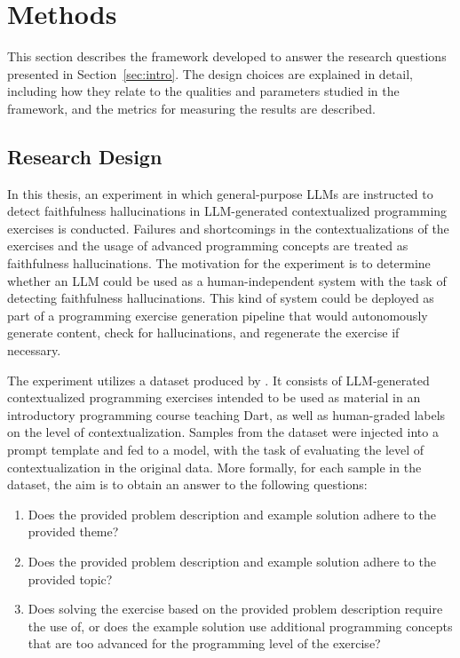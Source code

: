 \documentclass[english, 12pt, a4paper, sci, utf8, a-2b, online]{latex/definitions/aaltothesis}
\begin{document}
\clearpage

\section{Methods} \label{sec:methods}

This section describes the framework developed to answer the research questions presented in Section~\ref{sec:intro}. The design choices are explained in detail, including how they relate to the qualities and parameters studied in the framework, and the metrics for measuring the results are described.

\subsection{Research Design} \label{sec:design}

In this thesis, an experiment in which general-purpose LLMs are instructed to detect faithfulness hallucinations in LLM-generated contextualized programming exercises is conducted. Failures and shortcomings in the contextualizations of the exercises and the usage of advanced programming concepts are treated as faithfulness hallucinations. The motivation for the experiment is to determine whether an LLM could be used as a human-independent system with the task of detecting faithfulness hallucinations. This kind of system could be deployed as part of a programming exercise generation pipeline that would autonomously generate content, check for hallucinations, and regenerate the exercise if necessary. 

The experiment utilizes a dataset produced by \textcite{10.1145/3632620.3671103}. It consists of LLM-generated contextualized programming exercises intended to be used as material in an introductory programming course teaching Dart, as well as human-graded labels on the level of contextualization. Samples from the dataset were injected into a prompt template and fed to a model, with the task of evaluating the level of contextualization in the original data. More formally, for each sample in the dataset, the aim is to obtain an answer to the following questions:
\begin{enumerate}
    \item Does the provided problem description and example solution adhere to the provided theme?
    \item Does the provided problem description and example solution adhere to the provided topic?
    \item Does solving the exercise based on the provided problem description require the use of, or does the example solution use additional programming concepts that are too advanced for the programming level of the exercise?
\end{enumerate}
\end{document}
